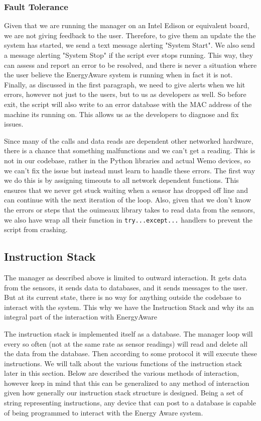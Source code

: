\documentclass{sig-alternate-05-2015}
\begin{document}
\subsubsection{Fault Tolerance}

Given that we are running the manager on an Intel Edison or equivalent board, we are not giving feedback to the user. Therefore, to give them an update the the system has started, we send a text message alerting "System Start". We also send a message alerting "System Stop" if the script ever stops running. This way, they can assess and report an error to be resolved, and there is never a situation where the user believe the EnergyAware system is running when in fact it is not. Finally, as discussed in the first paragraph, we need to give alerts when we hit errors, however not just to the users, but to us as developers as well. So before exit, the script will also write to an error database with the MAC address of the machine its running on. This allows us as the developers to diagnose and fix issues.

Since many of the calls and data reads are dependent other networked hardware, there is a chance that something malfunctions and we can't get a reading. This is not in our codebase, rather in the Python libraries and actual Wemo devices, so we can't fix the issue but instead must learn to handle these errors. The first way we do this is by assigning timeouts to all network dependent functions. This ensures that we never get stuck waiting when a sensor has dropped off line and can continue with the next iteration of the loop. Also, given that we don't know the errors or steps that the ouimeaux library takes to read data from the sensors, we also have wrap all their function in \texttt{try...except...} handlers to prevent the script from crashing.



\subsection{Instruction Stack}

The manager as described above is limited to outward interaction. It gets data from the sensors, it sends data to databases, and it sends messages to the user. But at its current state, there is no way for anything outside the codebase to interact with the system. This why we have the Instruction Stack and why its an integral part of the interaction with EnergyAware

The instruction stack is implemented itself as a database. The manager loop will every so often (not at the same rate as sensor readings) will read and delete all the data from the database. Then according to some protocol it will execute these instructions. We will talk about the various functions of the instruction stack later in this section. Below are described the various methods of interaction, however keep in mind that this can be generalized to any method of interaction given how generally our instruction stack structure is designed. Being a set of string representing instructions, any device that can post to a database is capable of being programmed to interact with the Energy Aware system.
\end{document}
